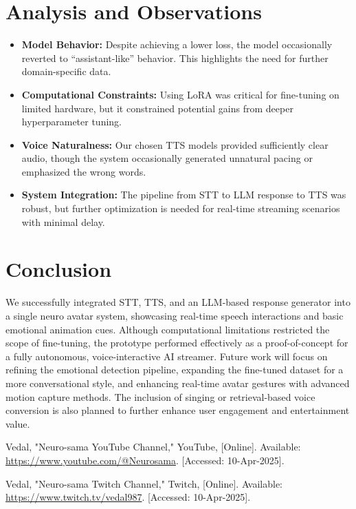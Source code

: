 \documentclass[conference]{IEEEtran}
\begin{document}
\section{Analysis and Observations}
\begin{itemize}
    \item \textbf{Model Behavior:} Despite achieving a lower loss, the model occasionally reverted to “assistant-like” behavior. This highlights the need for further domain-specific data.
    \item \textbf{Computational Constraints:} Using LoRA was critical for fine-tuning on limited hardware, but it constrained potential gains from deeper hyperparameter tuning.
    \item \textbf{Voice Naturalness:} Our chosen TTS models provided sufficiently clear audio, though the system occasionally generated unnatural pacing or emphasized the wrong words.
    \item \textbf{System Integration:} The pipeline from STT to LLM response to TTS was robust, but further optimization is needed for real-time streaming scenarios with minimal delay.
\end{itemize}

\section{Conclusion}
We successfully integrated STT, TTS, and an LLM-based response generator into a single neuro avatar system, showcasing real-time speech interactions and basic emotional animation cues. Although computational limitations restricted the scope of fine-tuning, the prototype performed effectively as a proof-of-concept for a fully autonomous, voice-interactive AI streamer. Future work will focus on refining the emotional detection pipeline, expanding the fine-tuned dataset for a more conversational style, and enhancing real-time avatar gestures with advanced motion capture methods. The inclusion of singing or retrieval-based voice conversion is also planned to further enhance user engagement and entertainment value.


\begin{thebibliography}{00}

Vedal, "Neuro-sama YouTube Channel," YouTube, [Online]. Available: \url{https://www.youtube.com/@Neurosama}. [Accessed: 10-Apr-2025].

Vedal, "Neuro-sama Twitch Channel," Twitch, [Online]. Available: \url{https://www.twitch.tv/vedal987}. [Accessed: 10-Apr-2025].

\end{thebibliography}
\end{document}
